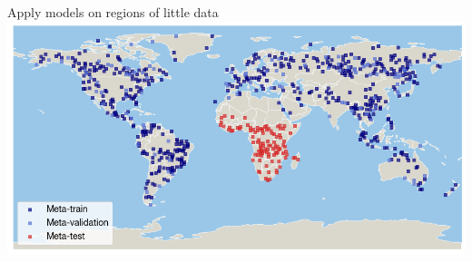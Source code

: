 \documentclass[11pt]{beamer}
\begin{document}
	\begin{frame}{Apply models on regions of little data}
		\includegraphics[width=\textwidth]{igarss2020/modis_task_map}
	\end{frame}

	
	
\end{document}
